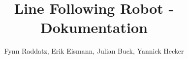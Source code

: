 \usepackage{siunitx}

\usepackage{enumitem}

\usepackage[dvipsnames]{xcolor}

\usepackage{listings, multicol}
\usepackage{tcolorbox}
\usetikzlibrary{shadings}

\usepackage{placeins}

\setcellgapes{5pt}
\makegapedcells

\usepackage{helvet}

\usepackage{pgfplots}
\pgfplotsset{compat=1.17}

\usepackage[european,straightvoltages]{circuitikz}
\usetikzlibrary{calc}
\usetikzlibrary{patterns}

\usepackage{hhline}


\usepackage{mathtools}


\usepackage{fancybox,fancyhdr}
\pagestyle{plain}
\cfoot{\thepage}
\setlength{\headheight}{15pt}



\setcounter{secnumdepth}{5}
\setcounter{tocdepth}{5}

\usepackage[hyphens]{url}

\usepackage{hyperref}

\title{Line Following Robot - Dokumentation}
\author{Fynn Raddatz, Erik Eismann, Julian Buck, Yannick Hecker}
